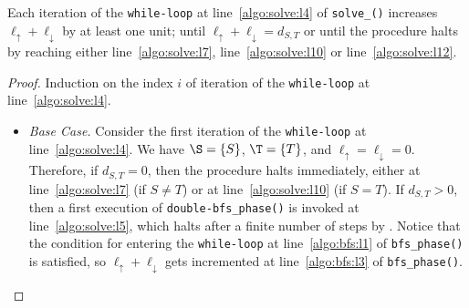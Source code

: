 \begin{lemma}\label{lemma:pre_solve_halts_finite}
Each iteration of the \texttt{while-loop} at line~\ref{algo:solve:l4} of \texttt{solve\_\mainproblem()}
increases $\ell_\uparrow + \ell_\downarrow$ by at least one unit;
until $\ell_\uparrow + \ell_\downarrow=d_{S,T}$ or until the procedure halts by reaching
either line~\ref{algo:solve:l7}, line~\ref{algo:solve:l10} or line~\ref{algo:solve:l12}.
\end{lemma}
\begin{proof} Induction on the index $i$
of iteration of the \texttt{while-loop} at line~\ref{algo:solve:l4}.
\begin{itemize}
\item \emph{Base Case.} Consider the first iteration of the \texttt{while-loop} at line~\ref{algo:solve:l4}.
We have $\S=\{S\}$, $\T=\{T\}$, and $\ell_\uparrow=\ell_\downarrow=0$.
Therefore, if $d_{S,T}=0$, then the procedure halts immediately,
either at line~\ref{algo:solve:l7} (if $S\neq T$) or at line~\ref{algo:solve:l10} (if $S=T$).
If $d_{S,T}>0$, then a first execution of \texttt{double-bfs\_phase()}
is invoked at line~\ref{algo:solve:l5}, which halts after a finite number of steps by .
Notice that the condition for entering  the \texttt{while-loop}
at line~\ref{algo:bfs:l1} of \texttt{bfs\_phase()} is satisfied, so
$\ell_\uparrow+\ell_\downarrow$ gets incremented at line~\ref{algo:bfs:l3} of \texttt{bfs\_phase()}.


\end{itemize}
\end{proof}

